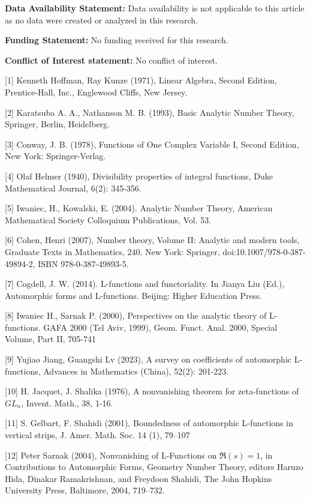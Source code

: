 \documentclass[12pt]{article}
\begin{document}
\textbf{Data Availability Statement:} Data availability is not applicable to this article as no data were created or analyzed in this research.

\textbf{Funding Statement:} No funding received for this research.

\textbf{Conflict of Interest statement:} No conflict of interest.


[1] Kenneth Hoffman, Ray Kunze (1971), Linear Algebra, Second Edition,  Prentice-Hall, Inc., Englewood Cliffs, New Jersey.

[2] Karatsuba A. A., Nathanson M. B. (1993), Basic Analytic Number Theory, Springer, Berlin, Heidelberg.

[3] Conway, J. B. (1978), Functions of One Complex Variable I, Second Edition,  New York: Springer-Verlag.

[4] Olaf Helmer (1940), Divisibility properties of integral functions, Duke Mathematical Journal, 6(2): 345-356.

[5] Iwaniec, H., Kowalski, E. (2004). Analytic Number Theory, American Mathematical Society Colloquium Publications, Vol. 53.

[6] Cohen, Henri (2007), Number theory, Volume II: Analytic and modern tools, Graduate Texts in Mathematics, 240, New York: Springer, doi:10.1007/978-0-387-49894-2, ISBN 978-0-387-49893-5.

[7] Cogdell, J. W. (2014). L-functions and functoriality. In Jianya Liu (Ed.), Automorphic forms and L-functions. Beijing: Higher Education Press.

[8] Iwaniec H., Sarnak  P. (2000), Perspectives on the analytic theory of L-functions. GAFA 2000 (Tel Aviv, 1999), Geom. Funct. Anal. 2000, Special Volume, Part II, 705-741

[9] Yujiao Jiang, Guangshi Lv (2023), A survey on coefficients of automorphic L-functions, Advances in Mathematics (China), 52(2): 201-223.

[10] H. Jacquet, J. Shalika (1976), A nonvanishing theorem for zeta-functions of $GL_n$, Invent. Math., 38, 1-16.

[11] S. Gelbart, F. Shahidi (2001), Boundedness of automorphic L-functions in vertical strips, J. Amer. Math. Soc. 14 (1), 79–107

[12] Peter Sarnak (2004), Nonvanishing of L-Functions on $\Re(s) = 1$, in Contributions to Automorphic Forms, Geometry Number Theory, editors Haruzo Hida, Dinakar Ramakrishnan, and Freydoon Shahidi, The John Hopkins University Press, Baltimore, 2004, 719–732.
\end{document}
